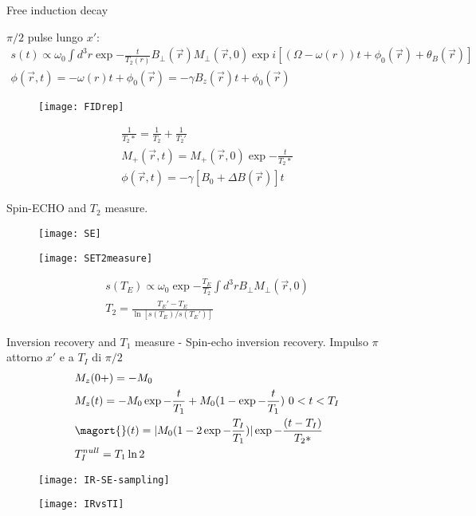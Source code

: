 \begin{frame}[allowframebreaks]{Free induction decay}

$\pi/2$ pulse lungo $x'$:
\begin{align*}
s(t)\propto\omega_0\int d^3r \exp{-\frac{t}{T_{2}(r)}}B_{\perp}(\vec{r})M_{\perp}(\vec{r},0)\exp{i[(\Omega-\omega(r))t+\phi_0(\vec{r})+\theta_B(\vec{r})]}\\
\phi(\vec{r},t)=-\omega(r)t+\phi_0(\vec{r})=-\gamma B_z(\vec{r})t+\phi_0(\vec{r})
\end{align*}
\begin{figure}[!ht]\texttt{[image: FIDrep]}\label{fig:FIDrep}\end{figure}
\begin{align*}
\frac{1}{T_2*}=\frac{1}{T_2}+\frac{1}{T_2'}\\
M_+(\vec{r},t)=M_+(\vec{r},0)\exp{-\frac{t}{T_2*}}\\
\phi(\vec{r},t)=-\gamma[B_0+\Delta B(\vec{r})]t
\end{align*}
\end{frame}

\begin{frame}[allowframebreaks]{Spin-ECHO and $T_2$ measure.}

\begin{figure}[!ht]\texttt{[image: SE]}\label{fig:SE}\end{figure}
\begin{figure}[!ht]\texttt{[image: SET2measure]}\label{fig:SET2measure}\end{figure}
\begin{align*}
s(T_E)\propto\omega_0\exp{-\frac{T_E}{T_2}}\int d^3 rB_{\perp}M_{\perp}(\vec{r},0)\\
T_2=\frac{T_E'-T_E}{\ln{[s(T_E)/s(T_E')]}}
\end{align*}
\end{frame}

\begin{frame}[allowframebreaks]{Inversion recovery and $T_1$ measure - Spin-echo inversion recovery.}
Impulso $\pi$ attorno $x'$ e a $T_I$ di $\pi/2$
\begin{align*}
&M_z(0+)=-M_0\\
&M_z(t)=-M_0\exp{-\frac{t}{T_1}}+M_0(1-\exp{-\frac{t}{T_1}})\ 0<t<T_I\\
&\magort{}(t)=|M_0(1-2\exp{-\frac{T_I}{T_1}})|\exp{-\frac{(t-T_I)}{T_2*}}\\
&T_I^{null}=T_1\ln{2}
\end{align*}

\begin{figure}[!ht]\texttt{[image: IR-SE-sampling]}\label{fig:IR-SE-sampling}
\end{figure}

\begin{figure}[!ht]\texttt{[image: IRvsTI]}\label{fig:IRvsTI}\end{figure}

\end{frame}

